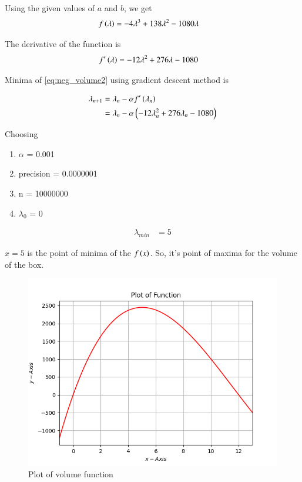 \documentclass[journal,12pt,twocolumn]{IEEEtran}
\begin{document}
Using the given values of $a$ and $b$, we get
\begin{align}
    \label{eq:neg_volume2}
    f\left(\lambda\right) &= -4\lambda^3 + 138\lambda^2 - 1080\lambda
\end{align}

The derivative of the function is
\begin{align}
    f^\prime\left(\lambda\right) &= -12\lambda^2 + 276\lambda - 1080 
\end{align}

Minima of \eqref{eq:neg_volume2} using gradient descent method is

\begin{align}
	\lambda_{n+1} &= \lambda_n - \alpha f^\prime\left(\lambda_n\right)\\
    \label{eq:grad_dec/eq1}
    &= \lambda_n - \alpha \left(-12\lambda_n^2 + 276\lambda_n - 1080\right)\\
\end{align}

Choosing
\begin{enumerate}
 \item $\alpha$ = 0.001
 \item precision = 0.0000001
 \item n = 10000000 
 \item $\lambda_0$ = 0
\end{enumerate}

\begin{align}
    \lambda_{min} &= 5
\end{align}

$x=5$ is the point of minima of the $f\left(x\right)$.
So, it's point of maxima for the volume of the box.

\begin{figure}[!htb]
    \centering
    \includegraphics[width=\columnwidth]{figs/plot.png}
    \caption{Plot of volume function}
    \label{fig:plot of function}
\end{figure}
\end{document}
